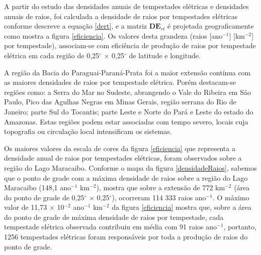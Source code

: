 
A partir do estudo das densidades anuais de tempestades elétricas e densidades anuais de raios, foi calculada a densidade de raios por tempestades elétricas conforme descreve a equação \ref{dert}, e a matriz $\mathbf{DE}_{rt}$ é projetada geograficamente 
como mostra a figura \ref{eficiencia}. Os valores desta grandeza (raios [ano$^{-1}$] [km$^{-2}$] por tempestade), associam-se com eficiência de produção de raios por tempestade elétrica em cada região de 0,25$^{\circ}$ $\times$ 0,25$^{\circ}$ de latitude e longitude.

A região da Bacia do Paraguai-Paraná-Prata foi a maior extensão contínua com as maiores densidades de raios por tempestade elétrica. Porém destacam-se regiões como: a Serra do Mar no Sudeste, abrangendo o Vale do Ribeira em São Paulo, Pico das Agulhas Negras em Minas Gerais, região serrana do Rio de Janeiro; parte Sul do Tocantis; parte Leste e Norte do Pará e Leste do estado do Amazonas. Estas regiões podem estar associadas com tempo severo, locais cuja  topografia ou  circulação local intensificam os sistemas.

Os maiores valores da escala de cores da figura \ref{eficiencia} que representa a densidade anual de raios por tempestades elétricas, foram observados sobre a região do Lago Maracaibo. Conforme o mapa da figura \ref{densidadeRaios}, sabemos que o ponto de grade com a máxima densidade de raios sobre a região do Lago Maracaibo (148,1 ano$^{-1}$ km$^{-2}$), mostra que sobre a extensão de 772 km$^{-2}$ (área do ponto de grade de  0,25$^{\circ}$ $\times$ 0,25$^{\circ}$), ocorreram {114 333} raios ano$^{-1}$. O máximo valor de  11,73 $\times$ 10$^{-2}$ ano$^{-1}$ km$^{-2}$ da figura \ref{eficiencia} mostra que, sobre a área do ponto de grade de máxima densidade de raios por tempestade, cada tempestade elétrica observada contribuiu em média com 91 raios ano$^{-1}$, portanto, 1256 tempestades elétricas foram responsáveis por toda a produção de raios do ponto de grade.  



